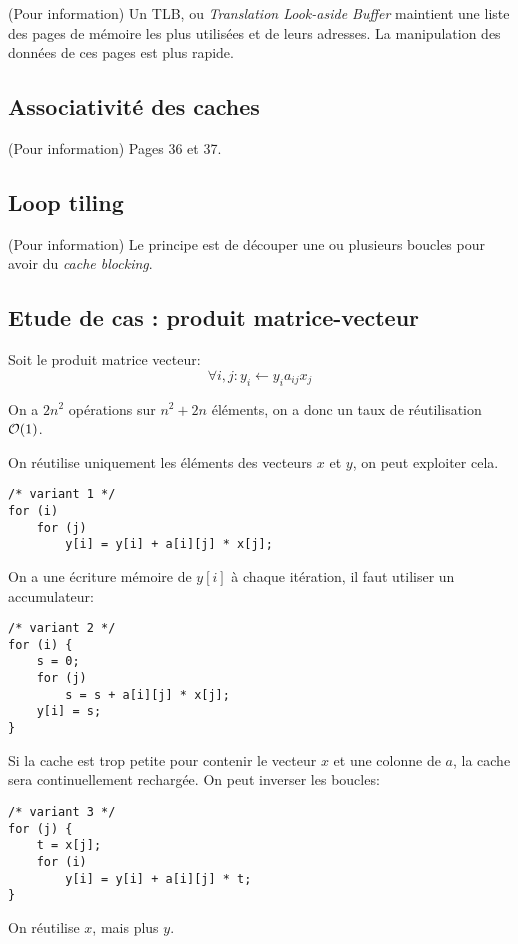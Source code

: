 (Pour information)
Un TLB, ou  \textit{Translation Look-aside Buffer} maintient une liste des pages de mémoire les plus utilisées et de leurs adresses. La manipulation des données de ces pages est plus rapide.

	\subsection{Associativité des caches}
	
	(Pour information) Pages 36 et 37.

	\subsection{Loop tiling}

(Pour information)
Le principe est de découper une ou plusieurs boucles pour avoir du \textit{cache blocking}.
	
	\subsection{Etude de cas : produit matrice-vecteur}
	
Soit le produit matrice vecteur:
\begin{equation}
\forall i,j : y_i \leftarrow y_i a_{i j} x_j
\end{equation}

On a $2n^2$ opérations sur $n^2 + 2n$ éléments, on a donc un taux de réutilisation $\mathcal{O}(1)$.

On réutilise uniquement les éléments des vecteurs $x$ et $y$, on peut exploiter cela.
\begin{verbatim}
/* variant 1 */
for (i)
    for (j)
        y[i] = y[i] + a[i][j] * x[j];
\end{verbatim}

On a une écriture mémoire de $y[i]$ à chaque itération, il faut utiliser un accumulateur:

\begin{verbatim}
/* variant 2 */
for (i) {
    s = 0;
    for (j)
        s = s + a[i][j] * x[j];
    y[i] = s;
}
\end{verbatim}

Si la cache est trop petite pour contenir le vecteur $x$ et une colonne de $a$, la cache sera continuellement rechargée.
On peut inverser les boucles:

\begin{verbatim}
/* variant 3 */
for (j) {
    t = x[j];
    for (i)
        y[i] = y[i] + a[i][j] * t;
}
\end{verbatim}
On réutilise $x$, mais plus $y$.

